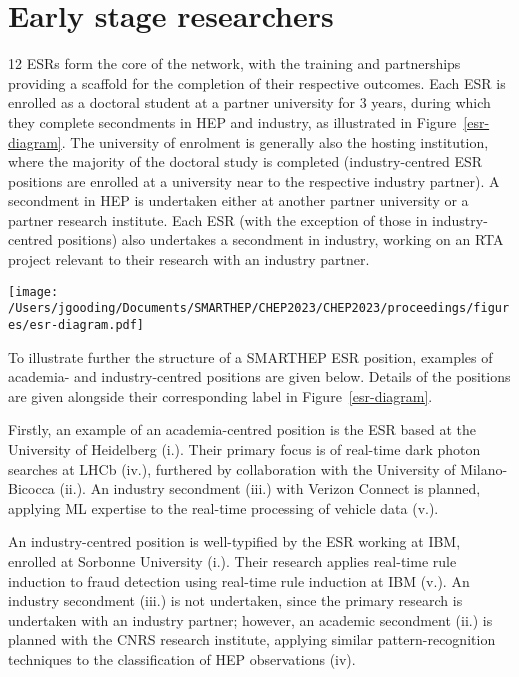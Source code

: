 \section{Early stage researchers}
\label{esrs}
12 ESRs form the core of the network, with the training and partnerships providing a scaffold for the completion of their respective outcomes. Each ESR is enrolled as a doctoral student at a partner university for 3 years, during which they complete secondments in HEP and industry, as illustrated in Figure~\ref{esr-diagram}. The university of enrolment is generally also the hosting institution, where the majority of the doctoral study is completed (industry-centred ESR positions are enrolled at a university near to the respective industry partner). A secondment in HEP is undertaken either at another partner university or a partner research institute. Each ESR (with the exception of those in industry-centred positions) also undertakes a secondment in industry, working on an RTA project relevant to their research with an industry partner.

\begin{figure*}[h!]
    \centering
    \texttt{[image: /Users/jgooding/Documents/SMARTHEP/CHEP2023/CHEP2023/proceedings/figures/esr-diagram.pdf]}
    \caption{Structure of a SMARTHEP ESR position. Each ESR is enrolled (i.), during which they will undertake secondments with network partners in HEP (ii.) and industry (iii.). Through the combination of primary and secondment work, each ESR will complete goals in HEP (iv.) and industry (v.), discussed in further detail in Section~\ref{outcomes}. Precise durations of the secondments vary between ESR positions.}
    \label{esr-diagram}
\end{figure*}

To illustrate further the structure of a SMARTHEP ESR position, examples of academia- and industry-centred positions are given below. Details of the positions are given alongside their corresponding label in Figure~\ref{esr-diagram}.

Firstly, an example of an academia-centred position is the ESR based at the University of Heidelberg (i.). Their primary focus is of real-time dark photon searches at LHCb (iv.), furthered by collaboration with the University of Milano-Bicocca (ii.). An industry secondment (iii.) with Verizon Connect is planned, applying ML expertise to the real-time processing of vehicle data (v.).

An industry-centred position is well-typified by the ESR working at IBM, enrolled at Sorbonne University (i.). Their research applies real-time rule induction to fraud detection using real-time rule induction at IBM (v.). An industry secondment (iii.) is not undertaken, since the primary research is undertaken with an industry partner; however, an academic secondment (ii.) is planned with the CNRS research institute, applying similar pattern-recognition techniques to the classification of HEP observations (iv).
